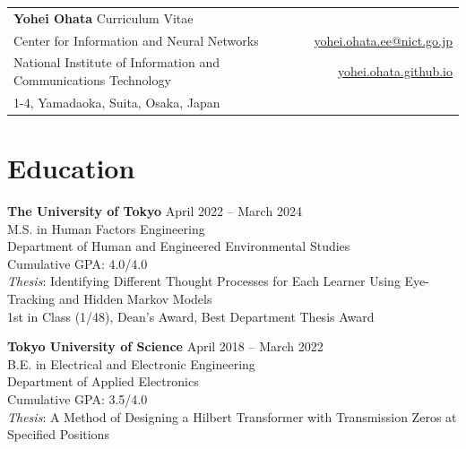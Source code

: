 \documentclass[letterpaper,10.5pt]{article}
\begin{document}
\begin{tabularx}{\textwidth}{@{}X r@{}}
{\LARGE \textbf{Yohei Ohata} \hspace{10pt} Curriculum Vitae} & \\ %
\noalign{\vspace{6pt}}
Center for Information and Neural Networks & \href{mailto:yohei.ohata.ee@nict.go.jp}{yohei.ohata.ee@nict.go.jp} \\
National Institute of Information and Communications Technology & \href{https://yohei.ohata.github.io}{yohei.ohata.github.io} \\
1-4, Yamadaoka, Suita, Osaka, Japan & \\
\end{tabularx}

\vspace{10pt}

\section*{Education}
\textbf{The University of Tokyo} \hfill April 2022 -- March 2024 \\
M.S. in Human Factors Engineering \\
Department of Human and Engineered Environmental Studies \\
Cumulative GPA: 4.0/4.0 \\
{\small \textit{Thesis}: Identifying Different Thought Processes for Each Learner Using Eye-Tracking and Hidden Markov Models} \\
{\small 1st in Class (1/48), Dean’s Award, Best Department Thesis Award} \\
\par\vspace{6pt}
\textbf{Tokyo University of Science} \hfill April 2018 -- March 2022 \\
B.E. in Electrical and Electronic Engineering \\
Department of Applied Electronics \\
Cumulative GPA: 3.5/4.0 \\
{\small \textit{Thesis}: A Method of Designing a Hilbert Transformer with Transmission Zeros at Specified Positions} \\

\par\vspace{6pt}
\end{document}
